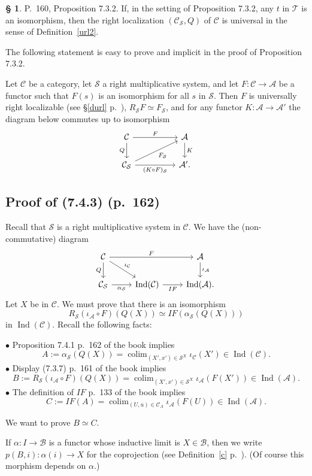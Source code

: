 \documentclass[12pt]{article}%
\theoremstyle{remark}
\theoremstyle{definition}
\newtheorem{s}[thm]{\S}%
\newcommand{\bu}{\bullet}
\newcommand{\nn}{\noindent}
\newcommand{\cc}{\mathcal}
\newcommand{\A}{\mathcal A}
\newcommand{\B}{\mathcal B}
\newcommand{\C}{\mathcal C}
\newcommand{\SSS}{\mathcal S}
\DeclareMathOperator*{\colim}{colim}%
\DeclareMathOperator{\Ind}{Ind}
\begin{document}
\begin{s}\label{732} 
P.~160, Proposition 7.3.2. If, in the setting of Proposition 7.3.2, any $t$ in $\cc T$ is an isomorphism, then the right localization $(\C_{\cc S},Q)$ of $\C$ is universal in the sense of Definition~\ref{url2}.

The following statement is easy to prove and implicit in the proof of Proposition 7.3.2. 

Let $\C$ be a category, let $\SSS$ a right multiplicative system, and let $F:\C\to\A$ be a functor such that $F(s)$ is an isomorphism for all $s$ in $\SSS$. Then $F$ is universally right localizable (see \S\ref{durl} p.~\pageref{durl}), $R_{\SSS}F\simeq F_{\SSS}$, and for any functor $K:\A\to\A'$ the diagram below commutes up to isomorphism
$$
\begin{tikzcd}
\C\ar{rr}{F}\ar{d}[swap]{Q}&&\A\ar{d}{K}\\
\C_{\SSS}\ar{rr}[swap]{(K\circ F)_{\SSS}}\ar{rru}[swap]{F_{\SSS}}&&\A'.
\end{tikzcd}
$$
\end{s}


\subsection{Proof of (7.4.3) (p.~162)}

Recall that $\SSS$ is a right multiplicative system in $\C$. We have the (non-commutative) diagram
$$
\begin{tikzcd}
\C\ar{rr}{F}\ar{d}[swap]{Q}\ar{dr}{\iota_\C}&&\A\ar{d}{\iota_\A}\\ 
\C_\SSS\ar{r}[swap]{\alpha_\SSS}&\Ind(\C)\ar{r}[swap]{IF}&\Ind(\A).
\end{tikzcd}
$$
Let $X$ be in $\C$. We must prove that there is an isomorphism 
$$
R_\SSS(\iota_\A\circ F)(Q(X))\simeq IF(\alpha_\SSS(Q(X)))
$$ 
in $\Ind(\C)$. Recall the following facts: 

\nn$\bu$ Proposition 7.4.1 p.~162 of the book implies
$$
A:=\alpha_\SSS(Q(X))=\colim_{(X',x')\in\SSS^X}\iota_\C(X')\in\Ind(\C).
$$ 
$\bu$ Display (7.3.7) p.~161 of the book implies
$$
B:=R_\SSS(\iota_\A\circ F)(Q(X))=\colim_{(X',x')\in\SSS^X}\iota_\A(F(X'))\in\Ind(\A).
$$
$\bu$ The definition of $IF$ p.~133 of the book implies
$$
C:=IF(A)=\colim_{(U,u)\in\C_A}\iota_\A(F(U))\in\Ind(\A).
$$

We want to prove $B\simeq C$.

\nn{\em Notation.} If $\alpha:I\to\B$ is a functor whose inductive limit is $X\in\B$, then we write $p(B,i):\alpha(i)\to X$ for the coprojection (see Definition~\ref{c} p.~\pageref{c}). (Of course this morphism depends on $\alpha$.) 
\end{document}
